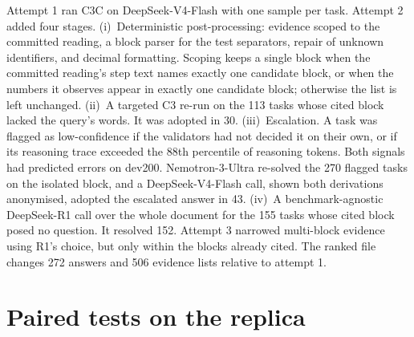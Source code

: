 \documentclass[11pt]{article}%
\begin{document}
Attempt 1 ran \textsc{C3C} on DeepSeek-V4-Flash with one sample per task.
Attempt 2 added four stages.
(i)~Deterministic post-processing: evidence scoped to the committed reading,
a block parser for the test separators, repair of unknown identifiers, and
decimal formatting. Scoping keeps a single block when the committed reading's
step text names exactly one candidate block, or when the numbers it observes
appear in exactly one candidate block; otherwise the list is left unchanged.
(ii)~A targeted \textsc{C3} re-run on the 113 tasks whose cited block lacked
the query's words. It was adopted in 30.
(iii)~Escalation. A task was flagged as low-confidence if the validators had
not decided it on their own, or if its reasoning trace exceeded the 88th
percentile of reasoning tokens. Both signals had predicted errors on dev200.
Nemotron-3-Ultra re-solved the 270 flagged tasks on the isolated block, and a
DeepSeek-V4-Flash call, shown both derivations anonymised, adopted the
escalated answer in 43.
(iv)~A benchmark-agnostic DeepSeek-R1 call over the whole document for the 155
tasks whose cited block posed no question. It resolved 152.
Attempt 3 narrowed multi-block evidence using R1's choice, but only within the
blocks already cited. The ranked file changes 272 answers and 506 evidence
lists relative to attempt 1.

\section{Paired tests on the replica}
\label{app:pvalues}
\end{document}
